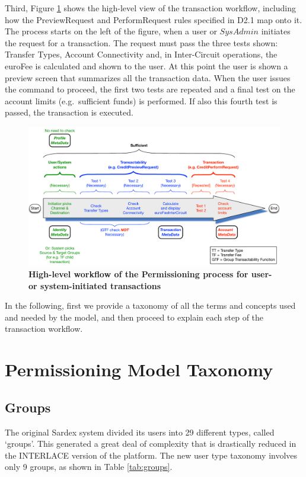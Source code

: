 Third, Figure \ref{fig:transactabilitywkflow} shows the high-level view of the transaction workflow, including how the PreviewRequest and PerformRequest rules specified in D2.1 map onto it. The process starts on the left of the figure, when a user or $SysAdmin$ initiates the request for a transaction. The request must pass the three tests shown: Transfer Types, Account Connectivity and, in Inter-Circuit operations, the euroFee is calculated and shown to the user. At this point the user is shown a preview screen that summarizes all the transaction data. When the user issues the command to proceed, the first two tests are repeated and a final test on the account limits (e.g.\ sufficient funds) is performed. If also this fourth test is passed, the transaction is executed.

\begin{figure}[h]
\centering
\includegraphics[width=17.5cm]{Figures/Transactability_Workflow}
\caption{\small\textbf{High-level workflow of the Permissioning process for user- or system-initiated transactions}}
\label{fig:transactabilitywkflow}
\end{figure}

In the following, first we provide a taxonomy of all the terms and concepts used and needed by the model, and then proceed to explain each step of the transaction workflow.


\section{Permissioning Model Taxonomy}
\subsection{Groups}
The original Sardex system divided its users into 29 different types, called `groups'. This generated a great deal of complexity that is drastically reduced in the INTERLACE version of the platform. The new user type taxonomy involves only 9 groups, as shown in Table \ref{tab:groups}.

